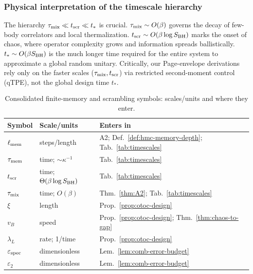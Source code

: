 \documentclass[aps,prd,preprint,onecolumn,superscriptaddress,nofootinbib,longbibliography,floatfix,11pt,showpacs,showkeys]{revtex4-2}
\theoremstyle{plain}
\theoremstyle{definition}
\theoremstyle{remark}
\begin{document}
\subsubsection{Physical interpretation of the timescale hierarchy}
The hierarchy $\tau_{\rm mix} \ll t_{\rm scr} \ll t_*$ is crucial. $\tau_{\rm mix} \sim O(\beta)$ governs the decay of few-body correlators and local thermalization. $t_{\rm scr} \sim O(\beta \log S_{\rm BH})$ marks the onset of chaos, where operator complexity grows and information spreads ballistically. $t_* \sim O(\beta S_{\rm BH})$ is the much longer time required for the entire system to approximate a global random unitary. Critically, our Page-envelope derivations rely only on the faster scales ($\tau_{\rm mix}, t_{\rm scr}$) via restricted second-moment control (qTPE), not the global design time $t_*$.



\begin{table}[t]
  \centering
  \caption{Consolidated finite-memory and scrambling symbols: scales/units and where they enter.}
  \label{tab:notation_consolidated}
  \small
  \begin{tabular*}{\textwidth}{@{\extracolsep{\fill}}lll@{}}
    \toprule
    \textbf{Symbol} & \textbf{Scale/units} & \textbf{Enters in} \\
    \midrule
    $\ell_{\rm mem}$ & steps/length & A2; Def.~\ref{def:hmc-memory-depth}; Tab.~\ref{tab:timescales} \\
    $\tau_{\rm mem}$ & time; $\sim \kappa^{-1}$ & Tab.~\ref{tab:timescales} \\
    $t_{\rm scr}$ & time; $\Theta(\beta\log S_{\rm BH})$ & Tab.~\ref{tab:timescales} \\
    $\tau_{\rm mix}$ & time; $O(\beta)$ & Thm.~\ref{thm:A2}; Tab.~\ref{tab:timescales} \\
    $\xi$ & length & Prop.~\ref{prop:otoc-design} \\
    $v_B$ & speed & Prop.~\ref{prop:otoc-design}; Thm.~\ref{thm:chaos-to-gap} \\
    $\lambda_L$ & rate; 1/time & Prop.~\ref{prop:otoc-design} \\
    $\varepsilon_{\rm spec}$ & dimensionless & Lem.~\ref{lem:comb-error-budget} \\
    $\varepsilon_2$ & dimensionless & Lem.~\ref{lem:comb-error-budget} \\
    \bottomrule
  \end{tabular*}
\end{table}
\end{document}
